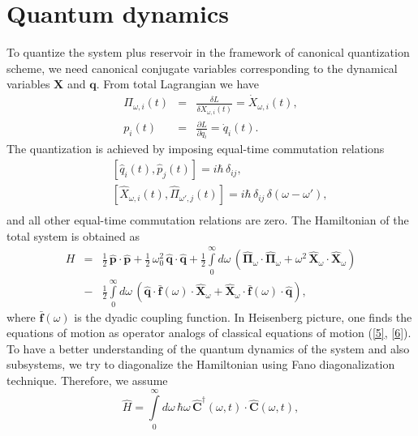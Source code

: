 \documentclass[preprint,showpacs,showkeys,groupedaddress,superscriptaddress]{revtex4}
\begin{document}
\section{Quantum dynamics}\label{Quantum dynamics}
\noindent To quantize the system plus reservoir in the framework of canonical quantization scheme, we need canonical conjugate variables corresponding to the dynamical variables $\mathbf{X}$ and $\mathbf{q}$. From total Lagrangian we have
\begin{eqnarray}
 \Pi _{\omega, i} (t) &=& \frac{\delta L}{\delta \dot{X} _{\omega, i}(t)} = \dot{X} _{\omega, i}(t), \nonumber\\
 p_i (t) &=& \frac{\partial L}{\partial \dot{q}_i } = \dot{q}_i (t).
\end{eqnarray}
The quantization is achieved by imposing equal-time commutation relations
\begin{eqnarray}
&& \left[ {\hat q_i (t),\hat p_j (t)} \right] = i\hbar \,\delta_{ij}, \\
&& \left[ \hat X_{\omega, i} (t),\hat \Pi_{\omega',j} (t) \right] = i\hbar\, \delta_{ij}\,\delta (\omega  - \omega '), \\
\end{eqnarray}
and all other equal-time commutation relations are zero. The Hamiltonian of the total system is obtained as
\begin{eqnarray}\label{H}
H &=& \frac{1}{2}\,\hat{\mathbf{p}}\cdot\hat{\mathbf{p}}+\frac{1}{2}\,\omega_0^2 \,\hat{\mathbf{q}}\cdot\hat{\mathbf{q}}+\frac{1}{2}\int\limits_0^\infty d\omega\, (\hat{\mathbf{\Pi}}_\omega\cdot\hat{\mathbf{\Pi}}_\omega+\omega ^2 \,\hat{\mathbf{X}}_\omega\cdot\hat{\mathbf{X}}_\omega)\nonumber\\
 &-& \frac{1}{2}\int\limits_0^\infty d\omega\,
(\hat{\mathbf{q}}\cdot \bar{\mathbf{f}}(\omega)\cdot\hat{\mathbf{X}}_\omega + \hat{\mathbf{X}}_\omega\cdot \bar{\mathbf{f}}(\omega)\cdot\hat{\mathbf{q}}),
\end{eqnarray}
where $\bar{\mathbf{f}}(\omega)$ is the dyadic coupling function. In Heisenberg picture, one finds the equations of motion as operator analogs of classical equations of motion (\ref{5}, \ref{6}). To have a better understanding of the quantum dynamics of the system and also subsystems, we try to diagonalize the Hamiltonian using Fano diagonalization technique. Therefore, we assume
\begin{equation}\label{58}
\hat{H} = \int\limits_0^\infty d\omega\, \hbar\omega\, \hat{\mathbf{C}}^{\dag} (\omega, t)\cdot\hat{\mathbf{C}} (\omega, t),
\end{equation}
\end{document}
